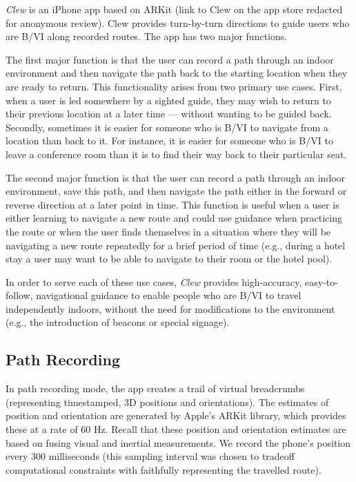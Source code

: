 \documentclass[chi_draft]{sigchi}
\newcommand{\BVI}{B/VI\xspace}
\begin{document}
\emph{Clew} is an iPhone app based on ARKit (link to Clew on the app store redacted for anonymous review).  Clew provides turn-by-turn directions to guide users who are \BVI along recorded routes.  The app has two major functions.

The first major function is that the user can record a path through an indoor environment and then navigate the path back to the starting location when they are ready to return.  This functionality arises from two primary use cases.  First, when a user is led somewhere by a sighted guide, they may wish to return to their previous location at a later time --- without wanting to be guided back.  Secondly, sometimes it is easier for someone who is \BVI to navigate from a location than back to it.  For instance, it is easier for someone who is \BVI to leave a conference room than it is to find their way back to their particular seat.

The second major function is that the user can record a path through an indoor environment, save this path, and then navigate the path either in the forward or reverse direction at a later point in time.  This function is useful when a user is either learning to navigate a new route and could use guidance when practicing the route or when the user finds themselves in a situation where they will be navigating a new route repeatedly for a brief period of time (e.g., during a hotel stay a user may want to be able to navigate to their room or the hotel pool).

In order to serve each of these use cases, \emph{Clew} provides high-accuracy, easy-to-follow, navigational guidance to enable people who are \BVI to travel independently indoors, without the need for modifications to the environment (e.g., the introduction of beacons or special signage).  

\subsection{Path Recording}

In path recording mode, the app creates a trail of virtual breadcrumbs (representing timestamped, 3D positions and orientations).  The estimates of position and orientation are generated by Apple's ARKit library, which provides these at a rate of 60 Hz.  Recall that these position and orientation estimates are based on fusing visual and inertial measurements.  We record the phone's position every $300$ milliseconds (this sampling interval was chosen to tradeoff computational constraints with faithfully representing the travelled route).
\end{document}
